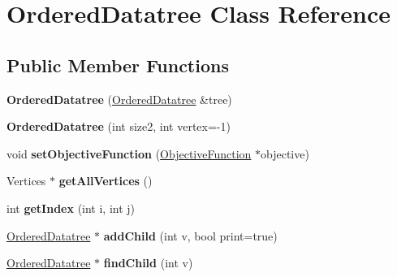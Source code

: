 \hypertarget{classOrderedDatatree}{\section{Ordered\-Datatree Class Reference}
\label{classOrderedDatatree}
}
\subsection*{Public Member Functions}
\begin{DoxyCompactItemize}
\item 
\hypertarget{classOrderedDatatree_a4f5024cc174646dc6483837c8c68d4d2}{{\bfseries Ordered\-Datatree} (\hyperlink{classOrderedDatatree}{Ordered\-Datatree} \&tree)}\label{classOrderedDatatree_a4f5024cc174646dc6483837c8c68d4d2}

\item 
\hypertarget{classOrderedDatatree_a7bb3bcab1152a0c854732730b3dd49a6}{{\bfseries Ordered\-Datatree} (int size2, int vertex=-\/1)}\label{classOrderedDatatree_a7bb3bcab1152a0c854732730b3dd49a6}

\item 
\hypertarget{classOrderedDatatree_a1a7cb343fd2dcab52df688dc1bbeea1f}{void {\bfseries set\-Objective\-Function} (\hyperlink{classObjectiveFunction}{Objective\-Function} $\ast$objective)}\label{classOrderedDatatree_a1a7cb343fd2dcab52df688dc1bbeea1f}

\item 
\hypertarget{classOrderedDatatree_acf3338e3b1201255fa2e3192843fc2ae}{Vertices $\ast$ {\bfseries get\-All\-Vertices} ()}\label{classOrderedDatatree_acf3338e3b1201255fa2e3192843fc2ae}

\item 
\hypertarget{classOrderedDatatree_a9bdc569ae3ede6fa3e027e3b37a8ff67}{int {\bfseries get\-Index} (int i, int j)}\label{classOrderedDatatree_a9bdc569ae3ede6fa3e027e3b37a8ff67}

\item 
\hypertarget{classOrderedDatatree_a503694e44cb7db99f290df984fb634a0}{\hyperlink{classOrderedDatatree}{Ordered\-Datatree} $\ast$ {\bfseries add\-Child} (int v, bool print=true)}\label{classOrderedDatatree_a503694e44cb7db99f290df984fb634a0}

\item 
\hypertarget{classOrderedDatatree_a4a88ab578cc74fb596b12a07adf39b46}{\hyperlink{classOrderedDatatree}{Ordered\-Datatree} $\ast$ {\bfseries find\-Child} (int v)}\label{classOrderedDatatree_a4a88ab578cc74fb596b12a07adf39b46}


\end{DoxyCompactItemize}
